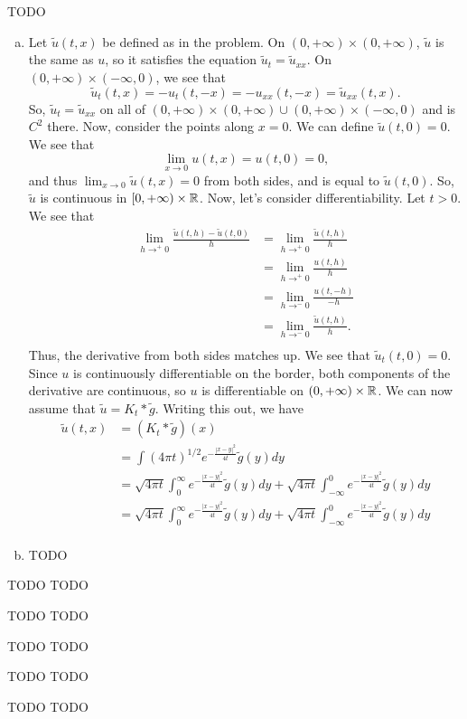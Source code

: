 \documentclass{article}
\begin{document}
\newpage
{} TODO
 \tri
\hop 
\solution
\newcommand{\tu}{\tilde{u}}
\begin{enumerate}[(a)]
    \item Let $\tilde{u}(t,x)$ be defined as in the problem. On $(0, +\infty) \times (0, +\infty)$, $\tilde{u}$ is the same as $u$, so it satisfies the equation $\tu_t = \tu_{xx}$. On $(0, +\infty) \times (-\infty, 0)$, we see that 
    \[\tu_t(t,x) = -u_t(t, -x) = -u_{xx}(t, -x) = \tu_{xx}(t,x).\]
    So, $\tu_t = \tu_{xx}$ on all of  $(0, +\infty) \times (0, +\infty)  \cup (0, +\infty) \times (-\infty, 0)$ and is $C^2$ there. Now, consider the points along $x=0$. We can define $\tu(t,0)= 0$. We see that 
    \[\lim_{x \to 0} u(t,x) = u(t,0) = 0,\]
    and thus $\lim_{x \to 0} \tu(t,x) = 0$ from both sides, and is equal to $\tu(t,0)$. So, $\tu$ is continuous in $[0,+\infty)\times \mathbb{R}$. 
    \hop 
    Now, let's consider differentiability. Let $t > 0$. We see that 
    \begin{align*}
        \lim_{h\to^+ 0} \frac{\tu(t,h)- \tu(t,0)}{h} &=  \lim_{h\to^+ 0} \frac{\tu(t,h)}{h} \\
        &= \lim_{h\to^+ 0} \frac{u(t,h)}{h}\\
        &= \lim_{h\to^- 0} \frac{u(t,-h)}{-h}\\
        &= \lim_{h\to^- 0} \frac{\tu(t,h)}{h}.\\
    \end{align*}
    Thus, the derivative from both sides matches up. We see that $\tu_t(t,0) = 0$. Since $u$ is continuously differentiable on the border, both components of the derivative are continuous, so $u$ is differentiable on $(0, +\infty) \times \mathbb{R}$. 
    \hop 
    We can now assume that $\tu = K_t * \tilde{g}$. Writing this out, we have 
    \begin{align*}
        \tu(t,x) &= (K_t * \tilde{g})(x)\\
        &= \int(4\pi t)^{1/2} e^{-\frac{|x-y|^2}{4t}} \tilde{g}(y)dy\\
        &= \sqrt{4\pi t}\int_{0}^\infty  e^{-\frac{|x-y|^2}{4t}} \tilde{g}(y)dy+\sqrt{4\pi t}\int_{-\infty}^0  e^{-\frac{|x-y|^2}{4t}} \tilde{g}(y)dy\\
        &= \sqrt{4\pi t}\int_{0}^\infty  e^{-\frac{|x-y|^2}{4t}} \tilde{g}(y)dy+\sqrt{4\pi t}\int_{-\infty}^0  e^{-\frac{|x-y|^2}{4t}} \tilde{g}(y)dy\\
    \end{align*} 
    \item TODO
\end{enumerate}


\newpage
{} TODO
 \tri
\hop 
\solution
TODO 


\newpage
{} TODO
 \tri
\hop 
\solution
TODO 


\newpage
{} TODO
 \tri
\hop 
\solution
TODO 


\newpage
{} TODO
 \tri
\hop 
\solution
TODO 


\newpage
{} TODO
 \tri
\hop 
\solution
TODO 
\end{document}
